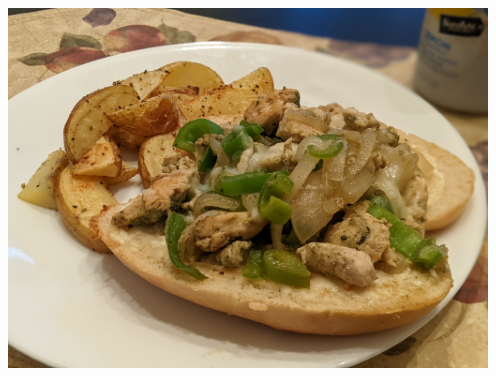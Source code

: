 \begin{center}
~\\~\\
\includegraphics[width=5in]{photos/hello_fresh/italian_chicken_pepper_sandwich.jpg}
\end{center}